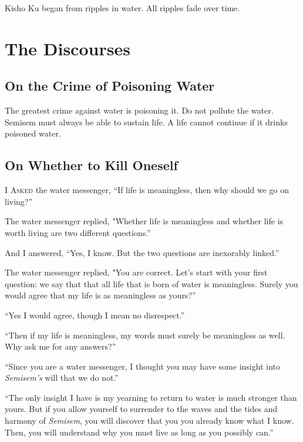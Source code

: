 \documentclass[12pt, letterpaper]{report}
\begin{document}
Kisho Ku began from ripples in water. All ripples fade over time.

\part{The Discourses}

\chapter{On the Crime of Poisoning Water}

The greatest crime against water is poisoning it. Do not pollute the water. Semisem must always be able to sustain life. A life cannot continue if it drinks poisoned water. 

\chapter{On Whether to Kill Oneself}

\vspace{1\baselineskip}
I A\textsc{sked} the water messenger, ``If life is meaningless, then why should we go on living?''

\vspace{1\baselineskip}
The water messenger replied, "Whether life is meaningless and whether life is worth living are two different questions.''

\vspace{1\baselineskip}
And I answered, ``Yes, I know. But the two questions are inexorably linked.''

\vspace{1\baselineskip}
The water messenger replied, "You are correct. Let's start with your first question: we say that that all life that is born of water is meaningless. Surely you would agree that my life is as meaningless as yours?''

\vspace{1\baselineskip}
``Yes I would agree, though I mean no disrespect.''

\vspace{1\baselineskip}
``Then if my life is meaningless, my words must surely be meaningless as well. Why ask me for any answers?''

\vspace{1\baselineskip}
``Since you are a water messenger, I thought you may have some insight into \textit{Semisem's} will that we do not.''

\vspace{1\baselineskip}
``The only insight I have is my yearning to return to water is much stronger than yours. But if you allow yourself to surrender to the waves and the tides and harmony of \textit{Semisem}, you will discover that you you already know what I know. Then, you will understand why you must live as long as you possibly can.''
\end{document}
